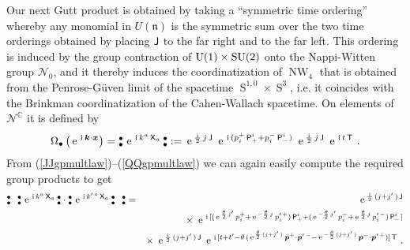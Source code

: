 \documentclass[11pt,a4paper]{article}
\DeclareMathOperator{\Sphere}{S}
\DeclareMathOperator{\NW}{NW}
\let\S\Sphere
\newcommand{\NOb}{\mbox{$\substack{\bullet\\\bullet}$}} %
\newcommand{\1}{\mathbb{1}}
\newcommand{\mbf}[1]{{\boldsymbol {#1} }}
\def\ii{{\,{\rm i}\,}}
\def\P{{\sf P}}
\def\T{{\sf T}}
\def\X{{\sf X}}
\def\J{{\sf J}}
\def\mx{{\mbf x}}
\def\mk{{\mbf k}}
\def\mbp{{\mbf p}}
\def\mfn{{\mathfrak n}}
\newcommand{\complex}{{\mathbb C}} %
\def\e{{\,\rm e}\,}
\def\bea{\begin{eqnarray}}
\def\eea{\end{eqnarray}}
\newcommand{\beq}{\begin{eqnarray}}
\newcommand{\eeq}{\end{eqnarray}}
\begin{document}
Our next Gutt product is obtained by taking a ``symmetric time
ordering'' whereby any monomial in $U(\mfn)$ is the symmetric sum
over the two time orderings obtained by placing $\J$ to the far right
and to the far left. This ordering is induced by the group contraction of
${\rm U}(1)\times{\rm SU}(2)$ onto the Nappi-Witten group
$\mathcal{N}_0$, and it thereby induces the coordinatization of
$\NW_4$ that is obtained from the
Penrose-G\"uven limit of the spacetime $\S^{1,0}\times\S^3$, i.e. it
coincides with the Brinkman coordinatization of the Cahen-Wallach
spacetime. On elements of $\mathcal{N}^\complex$ it is defined by
\beq
\Omega_\bullet\left(\e^{\ii\mk\cdot\mx}\right)=
\NOb\,\e^{\ii k^a\,\X_a}\,\NOb:=\e^{\frac\ii2\,j\,\J}~
\e^{\ii(p_i^+\,\P^i_+
+p_i^-\,\P^i_-)}~\e^{\frac\ii2\,j\,\J}~\e^{\ii t\,\T} \ .
\label{TOsymgpprods}\eeq
From (\ref{JJgpmultlaw})--(\ref{QQgpmultlaw}) we can again easily
compute the required group products to get
\bea
\NOb~~\NOb\,\e^{\ii k^a\,\X_a}\,\NOb\cdot\NOb\,\e^{\ii k^{\prime\,a}\,\X_a}
\,\NOb~~\NOb&=&\e^{\frac\ii2\,(j+j'\,)\,\J}\nonumber\\ &&\times~
\e^{\ii[(\e^{\frac{\theta}2\,j'}\,p_i^++
\e^{-\frac{\theta}2\,j}\,p_i^{\prime\,+})\,
\P^i_++(\e^{-\frac{\theta}2\,j'}\,p_i^-+
\e^{\frac{\theta}2\,j}\,p_i^{\prime\,-})\,\P^i_-]}
\nonumber\\ &&\times~\e^{\frac\ii2\,(j+j'\,)\,\J}~
\e^{\ii[t+t'-\theta\,(\e^{\frac{\theta}2\,(j+j'\,)}\,
\mbp^+\cdot\mbp^{\prime\,-}-\e^{-\frac{\theta}2\,(j+j'\,)}\,
\mbp^-\cdot\mbp^{\prime\,+})]\,\T} \ . \nonumber\\ &&
\label{TOsymgpprodexpl}\eea
\end{document}
